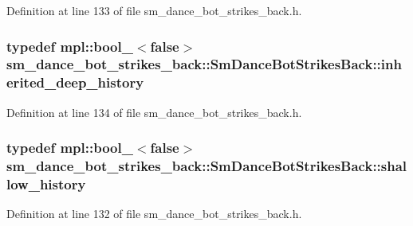 Definition at line 133 of file sm\+\_\+dance\+\_\+bot\+\_\+strikes\+\_\+back.\+h.

\subsubsection[{\texorpdfstring{inherited\+\_\+deep\+\_\+history}{inherited_deep_history}}]{\setlength{\rightskip}{0pt plus 5cm}typedef mpl\+::bool\+\_\+$<$false$>$ {\bf sm\+\_\+dance\+\_\+bot\+\_\+strikes\+\_\+back\+::\+Sm\+Dance\+Bot\+Strikes\+Back\+::inherited\+\_\+deep\+\_\+history}}\hypertarget{structsm__dance__bot__strikes__back_1_1SmDanceBotStrikesBack_aca174eb9bc9f50083f00b8bb1946fb6b}{}\label{structsm__dance__bot__strikes__back_1_1SmDanceBotStrikesBack_aca174eb9bc9f50083f00b8bb1946fb6b}


Definition at line 134 of file sm\+\_\+dance\+\_\+bot\+\_\+strikes\+\_\+back.\+h.

\subsubsection[{\texorpdfstring{shallow\+\_\+history}{shallow_history}}]{\setlength{\rightskip}{0pt plus 5cm}typedef mpl\+::bool\+\_\+$<$false$>$ {\bf sm\+\_\+dance\+\_\+bot\+\_\+strikes\+\_\+back\+::\+Sm\+Dance\+Bot\+Strikes\+Back\+::shallow\+\_\+history}}\hypertarget{structsm__dance__bot__strikes__back_1_1SmDanceBotStrikesBack_a193a12436ca97e49e143e642f314656b}{}\label{structsm__dance__bot__strikes__back_1_1SmDanceBotStrikesBack_a193a12436ca97e49e143e642f314656b}


Definition at line 132 of file sm\+\_\+dance\+\_\+bot\+\_\+strikes\+\_\+back.\+h.



